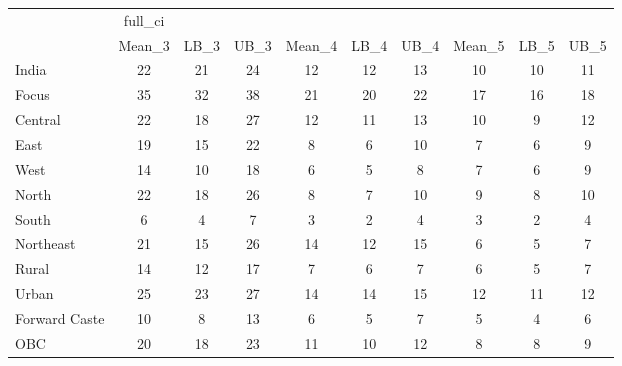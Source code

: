 \begin{tabular}{l*{9}{c}}
\toprule
                    &     full\_ci&            &            &            &            &            &            &            &            \\
                    &      Mean\_3&        LB\_3&        UB\_3&      Mean\_4&        LB\_4&        UB\_4&      Mean\_5&        LB\_5&        UB\_5\\
\midrule
India               &          22&          21&          24&          12&          12&          13&          10&          10&          11\\
Focus               &          35&          32&          38&          21&          20&          22&          17&          16&          18\\
Central             &          22&          18&          27&          12&          11&          13&          10&           9&          12\\
East                &          19&          15&          22&           8&           6&          10&           7&           6&           9\\
West                &          14&          10&          18&           6&           5&           8&           7&           6&           9\\
North               &          22&          18&          26&           8&           7&          10&           9&           8&          10\\
South               &           6&           4&           7&           3&           2&           4&           3&           2&           4\\
Northeast           &          21&          15&          26&          14&          12&          15&           6&           5&           7\\
Rural               &          14&          12&          17&           7&           6&           7&           6&           5&           7\\
Urban               &          25&          23&          27&          14&          14&          15&          12&          11&          12\\
Forward Caste       &          10&           8&          13&           6&           5&           7&           5&           4&           6\\
OBC                 &          20&          18&          23&          11&          10&          12&           8&           8&           9\\

\end{tabular}

